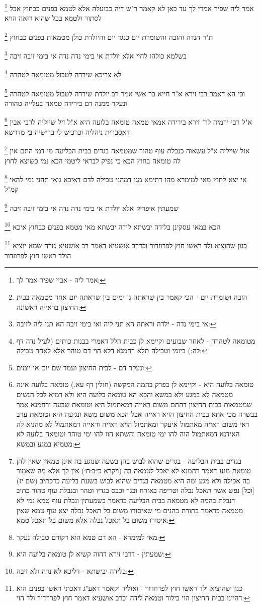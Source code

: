 \documentclass[12pt, openany]{book}
\newcommand{\footnotecomment}[1]{
	\renewcommand\thefootnote{}
	\footnote{#1}}
\newcommand{\commenta}[1]{\footnotecomment{#1}}
\begin{document}
{\commenta{אמר ליה - אביי שפיר אמר לך:}
אמר ליה שפיר אמרי לך עד כאן לא קאמר ר"ש דיה כבועלה אלא לטמא בפנים כבחוץ אבל לסתור ולטמא בכל שהוא רואה הויא
\commenta{הזבה ושומרת יום - הכי קאמר בין שראתה ג' ימים בין שראתה יום אחד מטמאה בבית החיצון בראייה ראשונה:}
ת"ר הנדה והזבה והשומרת יום כנגד יום והיולדת כולן מטמאות בפנים כבחוץ 
\commenta{אי בימי נדה - ילדה וראתה הא תני ליה ואי בימי זיבה הא תני ליה לזיבה:}
בשלמא כולהו לחיי אלא יולדת אי בימי נדה נדה אי בימי זיבה זיבה 
\commenta{מטומאה לטהרה - לאחר שבועים וקיימא לן כבית הלל דאמרי בבנות כותים (לעיל נדה דף לה:) ביומי וטבילה תלא רחמנא דלא הוי דם טוהר אלא לאחר טבילה:}
לא צריכא שירדה לטבול מטומאה לטהרה 
\commenta{ונעקר דם - לבית החיצון ועמד שם יום או יומים:}
וכי הא דאמר רבי זירא א"ר חייא בר אשי אמר רב יולדת שירדה לטבול מטומאה לטהרה ונעקר ממנה דם בירידה טמאה בעלייה טהורה 
\commenta{טומאה בלועה היא - וקיימא לן בפרק בהמה המקשה (חולין דף עא.) טומאה בלועה אינה מטמאה לא במגע ולא במשא והכא הא טומאה בלועה היא ולא דמיא לכל הנשים שמטמאות בבית החיצון דהתם משום ראייה דמאתמול היא וטומאת שבעה ורחמנא אמר בבשרה מכי אתא בבית החיצון הויא ראייה אבל הכא משום משא ונגיעה היא וטומאת ערב דאי משום ראייה מאתמול איעקר ומאתמול הויא ראייה וראייה דמאתמול לא מהניא לה האידנא דמאתמול הוה להו ימי טומאה והשתא הוו להו ימי טוהר וטומאה בלועה לא מטמיא במגע ובמשא:}
א"ל רבי ירמיה לר' זירא בירידה אמאי טמאה טומאה בלועה היא א"ל זיל שייליה לרבי אבין דאסברית ניהליה וכרכיש לי ברישיה בי מדרשא 
\commenta{בגדים בבית הבליעה - בגדים שהוא לבוש בהן בשעה שנוגע בה אינן טמאין שאין להן טומאת מגע דאמר רחמנא לא יאכל לטמאה בה (ויקרא כ״ב:ח׳) אין לך אלא מה שאמור בה אכילה ולא מגע ומה היא מטמאה בגדים שהוא לבוש בשעת בליעה כדכתיב (שם יז) [וכל] נפש אשר תאכל נבלה וטריפה באזרח ובגר וכבס בגדיו וטהר ובנבלת עוף טהור כתיב דנבלת בהמה לא מטמאה בבית הבליעה כדאמר בשמעתין ונבלת עוף טמא נמי לא מטמאה כדאמר בתורת כהנים מי שאיסורו משום בל תאכל נבלה יצא עוף טמא שאין איסורו משום בל תאכל נבלה אלא משום בל תאכל טמא:}
אזל שייליה א"ל עשאוה כנבלת עוף טהור שמטמאה בגדים בבית הבליעה מי דמי
התם אין לה טומאה בחוץ הכא כי נפיק לבראי ליטמי הכא נמי כשיצא לחוץ 
\commenta{מאי למימרא - הא דם טמא הוא דקודם טבילה נעקר:}
אי יצא לחוץ מאי למימרא מהו דתימא מגו דמהני טבילה לדם דאיכא גואי תהני נמי להאי קמ"ל 
\commenta{שמעתין - דרבי זירא דהוה קשיא לן טומאה בלועה היא:}
שמעתין איפריק אלא יולדת אי בימי נדה נדה אי בימי זיבה זיבה 
\commenta{בלידה יבישתא - דליכא לא נדה ולא זיבה:}
הכא במאי עסקינן בלידה יבשתא לידה יבשתא מאי מטמא בפנים כבחוץ איכא 
\commenta{כגון שהוציא ולד ראשו חוץ לפרוזדור - ואוליד וקאמר דאע"ג דאכתי ראשו בפנים הוא דהיינו בבית החיצון הוי כילוד וטמאה לידה וכרב אושעיא דאמר חוץ לפרוזדור ולד הוי:}
כגון שהוציא ולד ראשו חוץ לפרוזדור וכדרב אושעיא דאמר רב אושעיא גזרה שמא יוציא הולד ראשו חוץ לפרוזדור 
}
\end{document}
